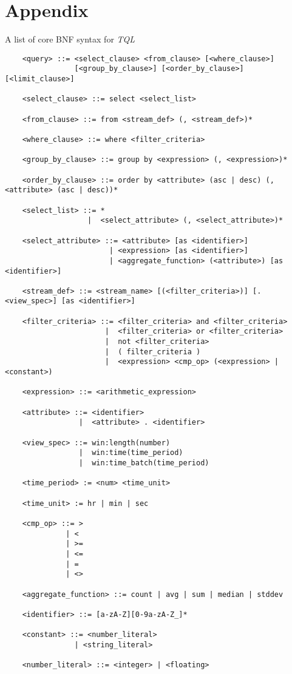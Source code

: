 \documentclass[conference, twocolumn, 11pt]{IEEEtran}
\theoremstyle{definition}
\begin{document}
\section*{Appendix}
A list of core BNF syntax for \emph{TQL}
\footnotesize\begin{verbatim}
	<query> ::= <select_clause> <from_clause> [<where_clause>] 
	            [<group_by_clause>] [<order_by_clause>] [<limit_clause>]
	
	<select_clause> ::= select <select_list>
	
	<from_clause> ::= from <stream_def> (, <stream_def>)*
	
	<where_clause> ::= where <filter_criteria>
	
	<group_by_clause> ::= group by <expression> (, <expression>)*
	
	<order_by_clause> ::= order by <attribute> (asc | desc) (, <attribute> (asc | desc))*
	
	<select_list> ::= *
	               |  <select_attribute> (, <select_attribute>)*
	
	<select_attribute> ::= <attribute> [as <identifier>]
	                    | <expression> [as <identifier>]
	                    | <aggregate_function> (<attribute>) [as <identifier>]
	
	<stream_def> ::= <stream_name> [(<filter_criteria>)] [. <view_spec>] [as <identifier>]
	
	<filter_criteria> ::= <filter_criteria> and <filter_criteria>
	                   |  <filter_criteria> or <filter_criteria>
	                   |  not <filter_criteria>
	                   |  ( filter_criteria )
	                   |  <expression> <cmp_op> (<expression> | <constant>)
	
	<expression> ::= <arithmetic_expression>
	
	<attribute> ::= <identifier>
	             |  <attribute> . <identifier>  
	
	<view_spec> ::= win:length(number)
	             |  win:time(time_period)
	             |  win:time_batch(time_period)
	
	<time_period> := <num> <time_unit>
	
	<time_unit> := hr | min | sec
	
	<cmp_op> ::= > 
	          | < 
	          | >= 
	          | <= 
	          | = 
	          | <>
	
	<aggregate_function> ::= count | avg | sum | median | stddev
	
	<identifier> ::= [a-zA-Z][0-9a-zA-Z_]*
	
	<constant> ::= <number_literal>
	            | <string_literal>
	
	<number_literal> ::= <integer> | <floating>
\end{verbatim}
\end{document}
